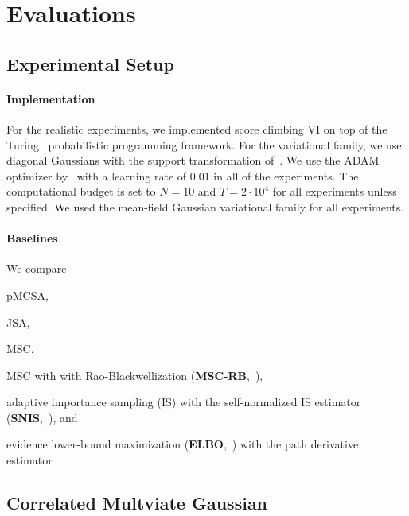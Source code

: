 \vspace{-0.05in}
\section{Evaluations}\label{section:eval}

\vspace{-0.05in}
\subsection{Experimental Setup}
\vspace{-0.05in}
\paragraph{Implementation}
For the realistic experiments, we implemented score climbing VI on top of the Turing~\citep{ge2018t} probabilistic programming framework.
For the variational family, we use diagonal Gaussians with the support transformation of~\citet{JMLR:v18:16-107}.
We use the ADAM optimizer by~\citet{kingma_adam_2015} with a learning rate of 0.01 in all of the experiments.
The computational budget is set to \(N=10\) and \(T=2\cdot10^4\) for all experiments unless specified.
We used the mean-field Gaussian variational family for all experiments.

\vspace{-0.1in}
\paragraph{Baselines}
We compare
\begin{enumerate*}[label=\textbf{(\roman*)}]
  \item pMCSA,
  \item JSA,
  \item MSC,
  \item MSC with with Rao-Blackwellization (\textbf{MSC-RB},~\citealt{NEURIPS2020_b2070693}),
  \item adaptive importance sampling (IS) with the self-normalized IS estimator (\textbf{SNIS},~\citealt{robert_monte_2004}), and
  \item evidence lower-bound maximization (\textbf{ELBO},~\citealt{pmlr-v33-ranganath14, JMLR:v18:16-107}) with the path derivative estimator~\citep{NIPS2017_e91068ff}
\end{enumerate*}

\vspace{-0.05in}
\subsection{Correlated Multviate Gaussian}\label{section:simulation}
\vspace{-0.05in}
